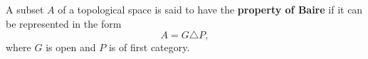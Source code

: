A subset $A$ of a topological space is said to have the \textbf{property of Baire} if it can be represented in the form
$$A = G \triangle P,$$
where $G$ is open and $P$ is of first category.
